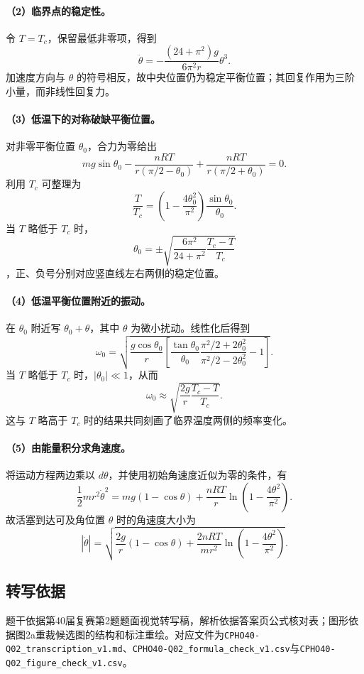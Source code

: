 \paragraph{（2）临界点的稳定性。}
令 $T=T_c$，保留最低非零项，得到
\[
\ddot\theta=-\frac{(24+\pi^2)g}{6\pi^2r}\theta^3.
\]
加速度方向与 $\theta$ 的符号相反，故中央位置仍为稳定平衡位置；其回复作用为三阶小量，而非线性回复力。

\paragraph{（3）低温下的对称破缺平衡位置。}
对非零平衡位置 $\theta_0$，合力为零给出
\[
mg\sin\theta_0-
\frac{nRT}{r(\pi/2-\theta_0)}+
\frac{nRT}{r(\pi/2+\theta_0)}=0.
\]
利用 $T_c$ 可整理为
\[
\frac{T}{T_c}=
\left(1-\frac{4\theta_0^2}{\pi^2}\right)
\frac{\sin\theta_0}{\theta_0}.
\]
当 $T$ 略低于 $T_c$ 时，
\[
\theta_0=\pm\sqrt{
\frac{6\pi^2}{24+\pi^2}\frac{T_c-T}{T_c}}
\]
，正、负号分别对应竖直线左右两侧的稳定位置。

\paragraph{（4）低温平衡位置附近的振动。}
在 $\theta_0$ 附近写 $\theta_0+\theta$，其中 $\theta$ 为微小扰动。线性化后得到
\[
\omega_0=
\sqrt{\frac{g\cos\theta_0}{r}
\left[
\frac{\tan\theta_0}{\theta_0}
\frac{\pi^2/2+2\theta_0^2}{\pi^2/2-2\theta_0^2}-1
\right]}.
\]
当 $T$ 略低于 $T_c$ 时，$|\theta_0|\ll1$，从而
\[
\omega_0\approx\sqrt{\frac{2g}{r}\frac{T_c-T}{T_c}}.
\]
这与 $T$ 略高于 $T_c$ 时的结果共同刻画了临界温度两侧的频率变化。

\paragraph{（5）由能量积分求角速度。}
将运动方程两边乘以 $d\theta$，并使用初始角速度近似为零的条件，有
\[
\frac12mr^2\dot\theta^2
=mg(1-\cos\theta)+\frac{nRT}{r}
\ln\left(1-\frac{4\theta^2}{\pi^2}\right).
\]
故活塞到达可及角位置 $\theta$ 时的角速度大小为
\[
|\dot\theta|=
\sqrt{\frac{2g}{r}(1-\cos\theta)+
\frac{2nRT}{mr^2}\ln\left(1-\frac{4\theta^2}{\pi^2}\right)}.
\]

\subsection{转写依据}

题干依据第40届复赛第2题题面视觉转写稿，解析依据答案页公式核对表；图形依据图2a重裁候选图的结构和标注重绘。对应文件为\texttt{CPHO40-Q02\_transcription\_v1.md}、\texttt{CPHO40-Q02\_formula\_check\_v1.csv}与\texttt{CPHO40-Q02\_figure\_check\_v1.csv}。
